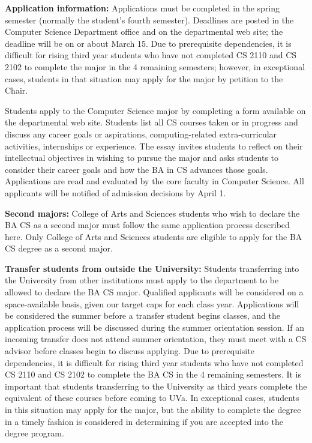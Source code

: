 {\bf Application information:} Applications must be completed in the
spring semester (normally the student's fourth semester).  Deadlines
are posted in the Computer Science Department office and on the
departmental web site; the deadline will be on or about March 15.  Due
to prerequisite dependencies, it is difficult for rising third year
students who have not completed CS 2110 and CS 2102 to complete the
major in the 4 remaining semesters; however, in exceptional cases,
students in that situation may apply for the major by petition to the
Chair.

Students apply to the Computer Science major by completing a form
available on the departmental web
site\myurlFormatted{\bacsDeclaringURL}. Students
list all CS courses taken or in progress and discuss any career goals
or aspirations, computing-related extra-curricular activities,
internships or experience. The essay invites students to reflect on
their intellectual objectives in wishing to pursue the major and asks
students to consider their career goals and how the BA in CS advances
those goals. Applications are read and evaluated by the core faculty
in Computer Science. All applicants will be notified of admission
decisions by April 1.

{\bf Second majors:} College of Arts and Sciences students who wish to
declare the BA CS as a second major must follow the same application
process described here. Only College of Arts and Sciences students are
eligible to apply for the BA CS degree as a second major.

{\bf Transfer students from outside the University:} Students
transferring into the University from other institutions must apply to
the department to be allowed to declare the BA CS major. Qualified
applicants will be considered on a space-available basis, given our
target caps for each class year. Applications will be considered the
summer before a transfer student begins classes, and the application
process will be discussed during the summer orientation session. If an
incoming transfer does not attend summer orientation, they must meet
with a CS advisor before classes begin to discuss applying.  Due to
prerequisite dependencies, it is difficult for rising third year
students who have not completed CS 2110 and CS 2102 to complete the
BA CS in the 4 remaining semesters. It is important that students
transferring to the University as third years complete the equivalent
of these courses before coming to UVa. In exceptional cases, students
in this situation may apply for the major, but the ability to complete
the degree in a timely fashion is considered in determining if
you are accepted into the degree program.




